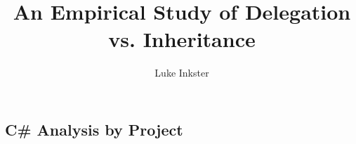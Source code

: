 \documentclass[11pt
              , a4paper
              , twoside
              , openright
              ]{report}
\title{An Empirical Study of Delegation vs. Inheritance}
\author{Luke Inkster}
\date{}
\begin{document}
\frontmatter



\maketitle



\tableofcontents


\mainmatter






%



\backmatter


%



\begin{appendices}
\chapter{C\# Analysis by Project}
\label{A:csProjStats} 

%
\end{appendices}
\end{document}
